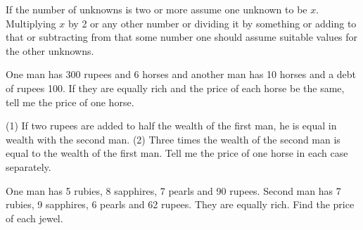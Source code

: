 \documentclass[]{article}
\begin{document}
{{If the number of unknowns is two or more assume one unknown to be $x$.
Multiplying $x$ by 2 or any other number or dividing it by something or
adding to that or subtracting from that some number one should assume
suitable values for the other unknowns.}

\begin{quote}  {
}  \end{quote}

One man has 300 rupees and 6 horses and another man has 10 horses and
a debt of rupees 100. If they are equally rich and the price of each
horse be the same, tell me the price of one horse.

\begin{quote}  {}  \end{quote}

(1) If two rupees are added to half the wealth of the first man, he is
equal in wealth with the second man. (2) Three times the wealth of the
second man is equal to the wealth of the first man. Tell me the price of
one horse in each case separately.

\begin{quote}  {
}  \end{quote}

{One man has 5 rubies, 8 sapphires, 7 pearls and 90 rupees. Second man
has 7 rubies, 9 sapphires, 6 pearls and 62 rupees. They are equally rich.
Find the price of each jewel.}

\begin{quote}  {}
\end{quote}}
\end{document}
